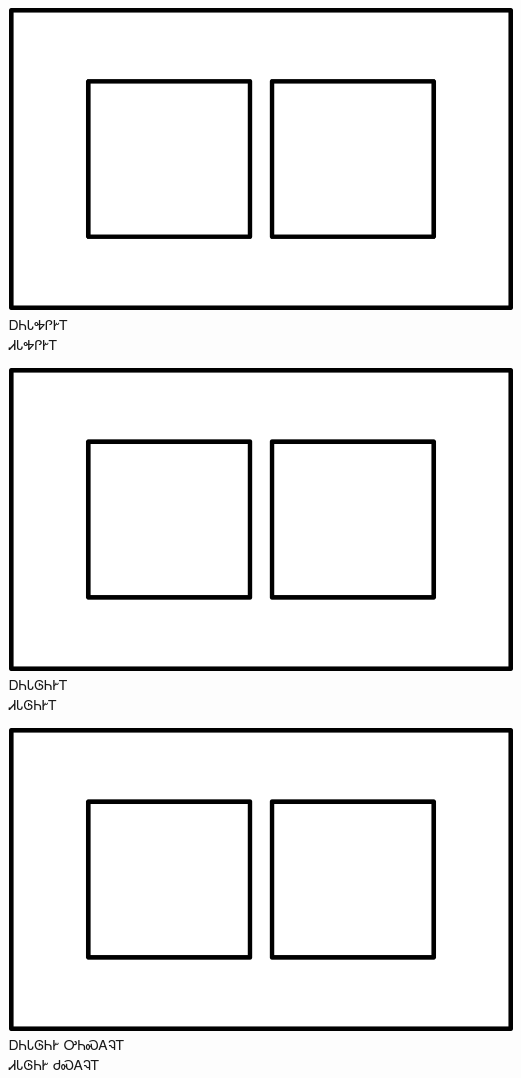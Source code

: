 \documentclass[avery5371]{flashcards}%
\begin{document}
\begin{flashcard}{
\includegraphics[width=0.95\columnwidth,height=.51\columnwidth,keepaspectratio]{../artwork/for-colors/squares-white}
}\Huge ᎠᏂᏓᎭᎵᎨᎢ\\ᏗᏓᎭᎵᎨᎢ
\end{flashcard}

\begin{flashcard}{
\includegraphics[width=0.95\columnwidth,height=.51\columnwidth,keepaspectratio]{../artwork/for-colors/squares-white}
}\Huge ᎠᏂᏓᎶᏂᎨᎢ\\ᏗᏓᎶᏂᎨᎢ
\end{flashcard}

\begin{flashcard}{
\includegraphics[width=0.95\columnwidth,height=.51\columnwidth,keepaspectratio]{../artwork/for-colors/squares-white}
}\Huge ᎠᏂᏓᎶᏂᎨ ᎤᏂᏍᎪᎸᎢ\\ᏗᏓᎶᏂᎨ ᏧᏍᎪᎸᎢ
\end{flashcard}
\end{document}

